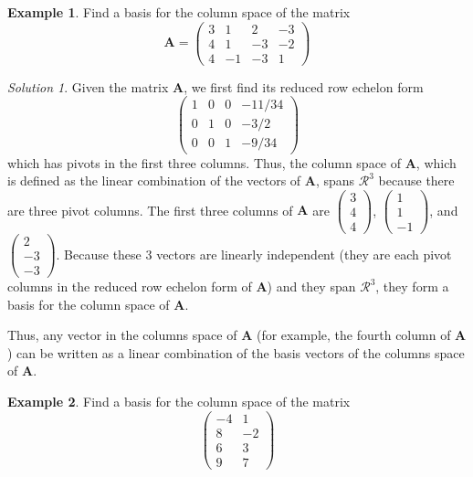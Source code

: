 \documentclass[
]{book}
\theoremstyle{definition}
\theoremstyle{definition}
\newtheorem{example}{Example}[chapter]
\theoremstyle{definition}
\theoremstyle{definition}
\theoremstyle{remark}
\newtheorem*{solution}{Solution}
\begin{document}
\begin{example}
Find a basis for the column space of the matrix
\[
\mathbf{A} = \begin{pmatrix} 3 & 1 & 2 & -3 \\ 4 & 1 & -3 & -2 \\ 4 & -1 & -3 & 1 \end{pmatrix}
\]
\end{example}

\begin{solution}
Given the matrix \(\mathbf{A}\), we first find its reduced row echelon form
\[
\begin{pmatrix} 1 & 0 & 0 & -11/34 \\ 0 & 1 & 0 & -3/2 \\ 0 & 0 & 1 & -9/34 \end{pmatrix}
\]
which has pivots in the first three columns. Thus, the column space of \(\mathbf{A}\), which is defined as the linear combination of the vectors of \(\mathbf{A}\), spans \(\mathcal{R}^3\) because there are three pivot columns. The first three columns of \(\mathbf{A}\) are \(\begin{pmatrix} 3 \\ 4 \\ 4 \end{pmatrix}\), \(\begin{pmatrix} 1 \\ 1 \\ -1 \end{pmatrix}\), and \(\begin{pmatrix} 2 \\ -3 \\ -3 \end{pmatrix}\). Because these 3 vectors are linearly independent (they are each pivot columns in the reduced row echelon form of \(\mathbf{A}\)) and they span \(\mathcal{R}^3\), they form a basis for the column space of \(\mathbf{A}\).

Thus, any vector in the columns space of \(\mathbf{A}\) (for example, the fourth column of \(\mathbf{A}\)) can be written as a linear combination of the basis vectors of the columns space of \(\mathbf{A}\).
\end{solution}

\begin{example}
Find a basis for the column space of the matrix
\[
\begin{pmatrix} -4 & 1 \\ 8 & -2 \\ 6 & 3 \\ 9 & 7 \end{pmatrix}
\]
\end{example}
\end{document}
